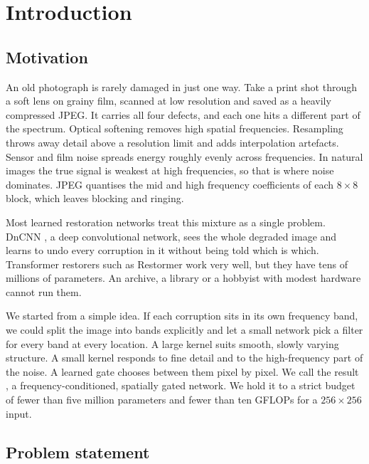 \chapter{Introduction}\label{ch:intro}

\section{Motivation}\label{sec:motivation}

An old photograph is rarely damaged in just one way. Take a print shot
through a soft lens on grainy film, scanned at low resolution and saved as a
heavily compressed JPEG. It carries all four defects, and each one hits a
different part of the spectrum. Optical softening removes high spatial
frequencies. Resampling throws away detail above a resolution limit and adds
interpolation artefacts. Sensor and film noise spreads energy roughly evenly
across frequencies. In natural images the true signal is weakest at high
frequencies, so that is where noise dominates. JPEG quantises the mid and
high frequency coefficients of each $8\times8$ block, which leaves blocking
and ringing.

Most learned restoration networks treat this mixture as a single problem.
DnCNN \cite{zhang2017dncnn}, a deep convolutional network, sees the whole
degraded image and learns to undo every corruption in it without being told
which is which. Transformer restorers such as Restormer
\cite{zamir2022restormer} work very well, but they have tens of millions of
parameters. An archive, a library or a hobbyist with modest hardware cannot
run them.

We started from a simple idea. If each corruption sits in its own frequency
band, we could split the image into bands explicitly and let a small network
pick a filter for every band at every location. A large kernel suits smooth,
slowly varying structure. A small kernel responds to fine detail and to the
high-frequency part of the noise. A learned gate chooses between them pixel
by pixel. We call the result \fcsg{}, a frequency-conditioned, spatially
gated network. We hold it to a strict budget of fewer than five million
parameters and fewer than ten GFLOPs for a $256\times256$ input.

\section{Problem statement}\label{sec:problem}

